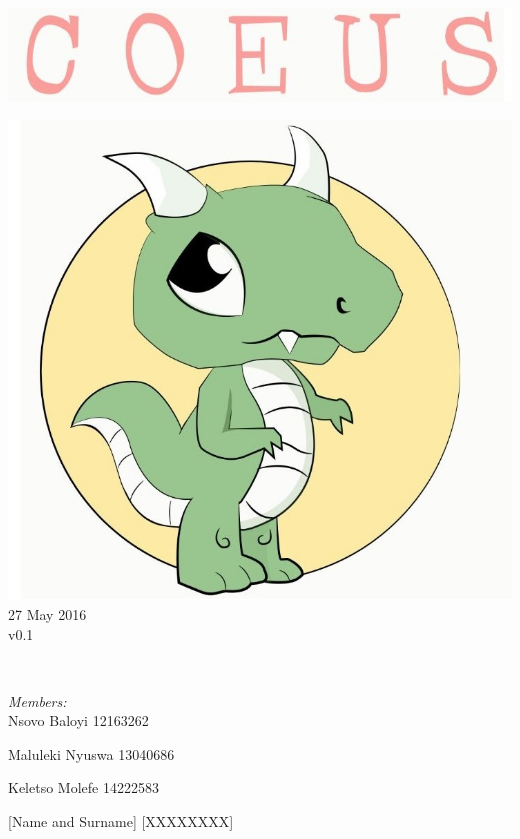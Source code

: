 \documentclass[a4paper,12pt]{article}
\begin{document}
\begin{titlepage}
	\includegraphics[width=\textwidth]{name} \\[1cm]
	\begin{minipage}{0.4\textwidth}
	\begin{flushleft} \large
	\includegraphics[width=\textwidth]{logo} \\[0.5cm]
	{\large 27 May 2016}\\
	{\large v0.1}
	\end{flushleft}
	\end{minipage}
	~
	\begin{minipage}{0.5\textwidth}
	\begin{flushright} \large
	\emph{Members:}\\%
	Nsovo Baloyi 12163262

	Maluleki Nyuswa 13040686
	
	Keletso Molefe 14222583
	
	[Name and Surname] [XXXXXXXX]

	\end{flushright}
	\end{minipage}\\[4cm]
\end{titlepage}
\end{document}
